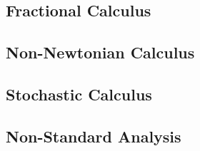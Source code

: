 \subsection{Fractional Calculus}


\subsection{Non-Newtonian Calculus}


% 


\subsection{Stochastic Calculus}


\subsection{Non-Standard Analysis}






\begin{comment}

\end{comment}
